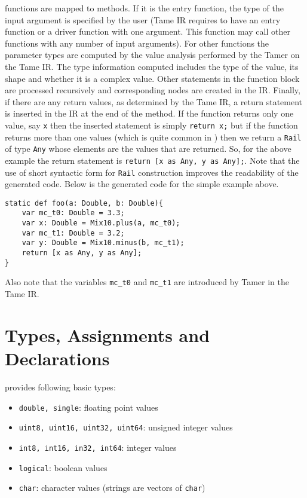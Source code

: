\matlab functions are mapped to \xten methods. If it is the entry
function, the type of the input argument is specified by the user (Tame
IR requires to have an entry function or a driver function with one
argument. This function may call other functions with any number of
input arguments). For other functions the parameter types are computed
by the value analysis performed by the Tamer on the Tame IR. The type
information computed includes the type of the value, its shape and
whether it is a complex value. Other statements in the function block
are processed recursively and corresponding nodes are created in the
\xten IR. Finally, if there are any return values, as determined by the
Tame IR, a return statement is inserted in the \xten IR at the end of
the method. If the function returns only one value, say \verb|x| then
the inserted statement is simply \verb|return x;| but if the function
returns more than one values (which is quite common in \matlab) then we
return a \texttt{Rail} of type \verb|Any| whose elements are the
values that are returned. So, for the above example the return statement
is \verb|return [x as Any, y as Any];|. Note that the use of short syntactic form
for \texttt{Rail} construction improves the readability of the
generated code. Below is the generated code for the simple example
above.

\begin{lstlisting}[language=X10,numbers=none]
static def foo(a: Double, b: Double){
    var mc_t0: Double = 3.3;
    var x: Double = Mix10.plus(a, mc_t0);
    var mc_t1: Double = 3.2;
    var y: Double = Mix10.minus(b, mc_t1);
    return [x as Any, y as Any];
}
\end{lstlisting}

Also note that the variables \verb|mc_t0| and \verb|mc_t1| are introduced by
Tamer in the Tame IR. 


\section{Types, Assignments and Declarations}

\matlab provides following basic types:
\begin{itemize}
\item \verb|double, single|: floating point values
\item \verb|uint8, uint16, uint32, uint64|: unsigned integer values 
\item \verb|int8, int16, in32, int64|:	integer values
\item \verb|logical|: boolean values
\item \verb|char|: character values (strings are vectors of \verb|char|)
\end{itemize}

